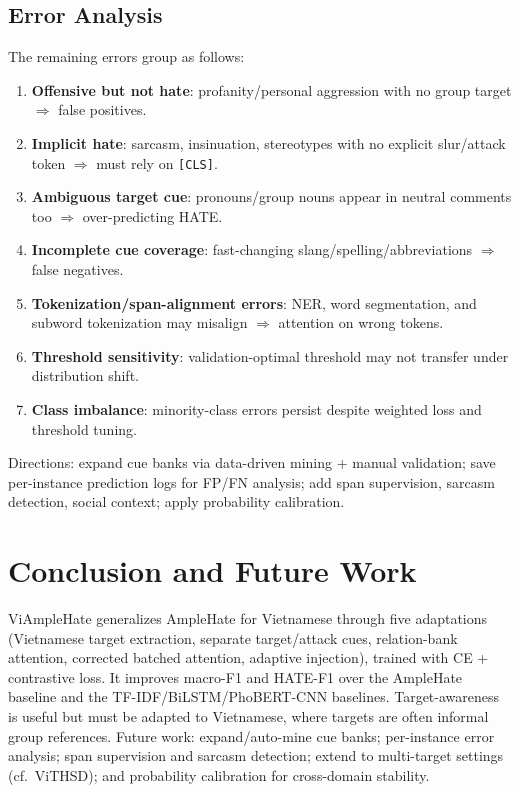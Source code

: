 \documentclass[11pt]{article}
\begin{document}
\subsection{Error Analysis}
The remaining errors group as follows:
\begin{enumerate}
  \item \textbf{Offensive but not hate}: profanity/personal aggression with no group target $\Rightarrow$ false positives.
  \item \textbf{Implicit hate}: sarcasm, insinuation, stereotypes with no explicit slur/attack token $\Rightarrow$ must rely on \texttt{[CLS]}.
  \item \textbf{Ambiguous target cue}: pronouns/group nouns appear in neutral comments too $\Rightarrow$ over-predicting HATE.
  \item \textbf{Incomplete cue coverage}: fast-changing slang/spelling/abbreviations $\Rightarrow$ false negatives.
  \item \textbf{Tokenization/span-alignment errors}: NER, word segmentation, and subword tokenization may misalign $\Rightarrow$ attention on wrong tokens.
  \item \textbf{Threshold sensitivity}: validation-optimal threshold may not transfer under distribution shift.
  \item \textbf{Class imbalance}: minority-class errors persist despite weighted loss and threshold tuning.
\end{enumerate}
Directions: expand cue banks via data-driven mining + manual validation; save per-instance prediction logs for FP/FN analysis; add span supervision, sarcasm detection, social context; apply probability calibration.

\section{Conclusion and Future Work}
ViAmpleHate generalizes AmpleHate for Vietnamese through five adaptations (Vietnamese target extraction, separate target/attack cues, relation-bank attention, corrected batched attention, adaptive injection), trained with CE + contrastive loss. It improves macro-F1 and HATE-F1 over the AmpleHate baseline and the TF-IDF/BiLSTM/PhoBERT-CNN baselines. Target-awareness is useful but must be adapted to Vietnamese, where targets are often informal group references. Future work: expand/auto-mine cue banks; per-instance error analysis; span supervision and sarcasm detection; extend to multi-target settings (cf.\ ViTHSD); and probability calibration for cross-domain stability.
\end{document}
